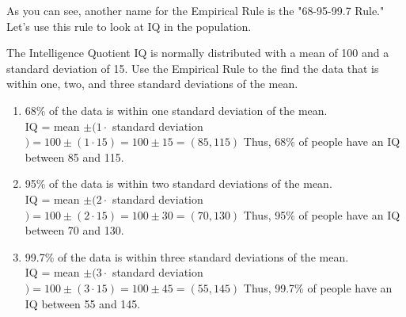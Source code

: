 As you can see, another name for the Empirical Rule is the "68-95-99.7 Rule."  Let's use this rule to look at IQ in the population.
\vfill
\pagebreak

\begin{example}[https://www.youtube.com/watch?v=cTRr0B5Cp8k]{The Intelligence Quotient}
IQ is normally distributed with a mean of 100 and a standard deviation of 15. Use the Empirical Rule to the find the data that is within one, two, and three standard deviations of the mean.

\begin{enumerate}
\item{68\% of the data is within one standard deviation of the mean.
\\ 
 IQ = mean $\pm (1 \cdot$ standard deviation $) = 100 \pm (1 \cdot 15) = 100 \pm 15 = (85, 115)$
 Thus, 68\% of people have an IQ between 85 and 115.
}
\item{95\% of the data is within two standard deviations of the mean.
\\ 
 IQ = mean $\pm (2 \cdot$ standard deviation $) = 100 \pm (2 \cdot 15) = 100 \pm 30 = (70, 130)$
 Thus, 95\% of people have an IQ between 70 and 130.
}
\item{99.7\% of the data is within three standard deviations of the mean.
\\ 
 IQ = mean $\pm (3 \cdot$ standard deviation $) = 100 \pm (3 \cdot 15) = 100 \pm 45 = (55, 145)$
Thus, 99.7\% of people have an IQ between 55 and 145.
}
\end{enumerate}
\begin{center}
\end{center}
\end{example}
